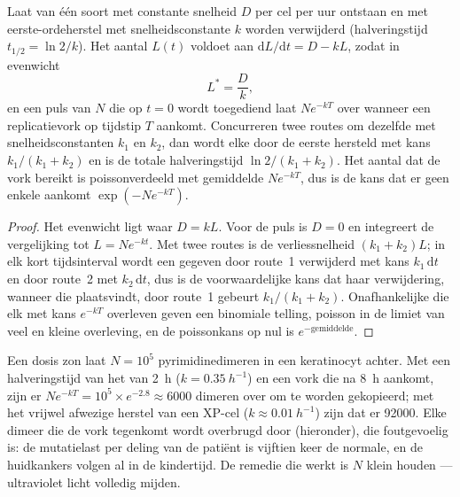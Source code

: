 \begin{theorem}\label{thm:b3:dna-repair:load}
Laat  van één soort met constante snelheid $D$ per cel per uur
ontstaan en met eerste-ordeherstel met snelheidsconstante $k$ worden
verwijderd (halveringstijd $t_{1/2} = \ln 2/k$). Het aantal 
$L(t)$ voldoet aan $\mathrm{d}L/\mathrm{d}t = D - kL$, zodat in
evenwicht
\[
L^{*} = \frac{D}{k},
\]
en een puls van $N$  die op $t = 0$ wordt toegediend laat
$N e^{-kT}$  over wanneer een replicatievork op tijdstip $T$
aankomt. Concurreren twee routes om dezelfde  met
snelheidsconstanten $k_{1}$ en $k_{2}$, dan wordt elke  door de
eerste hersteld met kans $k_{1}/(k_{1} +
k_{2})$ en is de totale halveringstijd $\ln 2/(k_{1} + k_{2})$. Het
aantal  dat de vork bereikt is poissonverdeeld met gemiddelde
$N e^{-kT}$, dus is de kans dat er geen enkele aankomt $\exp(-N e^{-kT})$.
\end{theorem}
\begin{proof}
Het evenwicht ligt waar $D = kL$. Voor de puls is $D = 0$ en
integreert de vergelijking tot $L = N e^{-kt}$. Met twee routes is de
verliessnelheid $(k_{1} + k_{2})L$; in elk kort tijdsinterval wordt een
gegeven  door route~1 verwijderd met kans $k_{1}\,\mathrm{d}t$ en
door route~2 met $k_{2}\,\mathrm{d}t$, dus is de voorwaardelijke kans
dat haar verwijdering, wanneer die plaatsvindt, door route~1 gebeurt
$k_{1}/(k_{1} +
k_{2})$. Onafhankelijke  die elk met kans $e^{-kT}$ overleven
geven een binomiale telling, poisson in de limiet van veel  en
kleine overleving, en de poissonkans op nul is $e^{-\text{gemiddelde}}$.
\end{proof}

\begin{example}\label{ex:b3:dna-repair:xp}
Een dosis zon laat $N = 10^{5}$ pyrimidinedimeren in een keratinocyt
achter. Met een halveringstijd van het  van
\qty{2}{h} ($k =
\qty{0.35}{h^{-1}}$) en een vork die na \qty{8}{h} aankomt, zijn er
$N e^{-kT} =
10^{5}\times e^{-2.8} \approx 6000$ dimeren over om te worden
gekopieerd; met het vrijwel afwezige herstel van een XP-cel ($k \approx
\qty{0.01}{h^{-1}}$) zijn dat er \num{92000}. Elke dimeer die de vork
tegenkomt wordt overbrugd door  (hieronder), die
foutgevoelig is: de mutatielast per deling van de patiënt is vijftien
keer de normale, en de huidkankers volgen al in de kindertijd. De
remedie die werkt is $N$ klein houden --- ultraviolet licht volledig
mijden.
\end{example}

